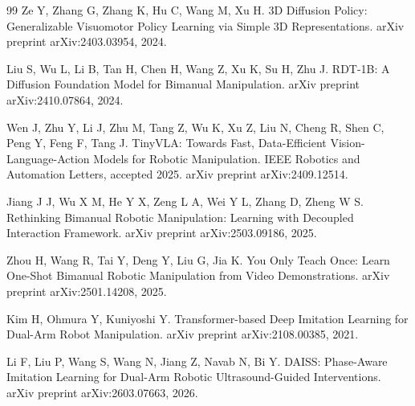 \documentclass[UTF8,a4paper,zihao=5,scheme=chinese]{ctexart}
\numberwithin{figure}{section}
\numberwithin{table}{section}
\begin{document}
\begin{thebibliography}{99}
Ze Y, Zhang G, Zhang K, Hu C, Wang M, Xu H. 3D Diffusion Policy: Generalizable Visuomotor Policy Learning via Simple 3D Representations. arXiv preprint arXiv:2403.03954, 2024.

Liu S, Wu L, Li B, Tan H, Chen H, Wang Z, Xu K, Su H, Zhu J. RDT-1B: A Diffusion Foundation Model for Bimanual Manipulation. arXiv preprint arXiv:2410.07864, 2024.

Wen J, Zhu Y, Li J, Zhu M, Tang Z, Wu K, Xu Z, Liu N, Cheng R, Shen C, Peng Y, Feng F, Tang J. TinyVLA: Towards Fast, Data-Efficient Vision-Language-Action Models for Robotic Manipulation. IEEE Robotics and Automation Letters, accepted 2025. arXiv preprint arXiv:2409.12514.

Jiang J J, Wu X M, He Y X, Zeng L A, Wei Y L, Zhang D, Zheng W S. Rethinking Bimanual Robotic Manipulation: Learning with Decoupled Interaction Framework. arXiv preprint arXiv:2503.09186, 2025.

Zhou H, Wang R, Tai Y, Deng Y, Liu G, Jia K. You Only Teach Once: Learn One-Shot Bimanual Robotic Manipulation from Video Demonstrations. arXiv preprint arXiv:2501.14208, 2025.

Kim H, Ohmura Y, Kuniyoshi Y. Transformer-based Deep Imitation Learning for Dual-Arm Robot Manipulation. arXiv preprint arXiv:2108.00385, 2021.

Li F, Liu P, Wang S, Wang N, Jiang Z, Navab N, Bi Y. DAISS: Phase-Aware Imitation Learning for Dual-Arm Robotic Ultrasound-Guided Interventions. arXiv preprint arXiv:2603.07663, 2026.

\end{thebibliography}
\end{document}
